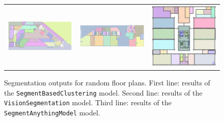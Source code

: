 \documentclass[11pt]{article}
\begin{document}
\begin{figure}[h]
\begin{tabular}{ccc}
        \includegraphics[width=0.3\linewidth]{figures/SAM_pred-1.png} &
        \includegraphics[width=0.3\linewidth]{figures/SAM_pred-2.png} &
        \includegraphics[width=0.3\linewidth]{figures/SAM_pred-3.png} \\
    \end{tabular}
    \caption{Segmentation outputs for random floor plans.
    First line: results of the \texttt{SegmentBasedClustering} model.
    Second line: results of the \texttt{VisionSegmentation} model.
    Third line: results of the \texttt{SegmentAnythingModel} model.}
    \label{fig:segmentation_results}
\end{figure}

\end{document}
